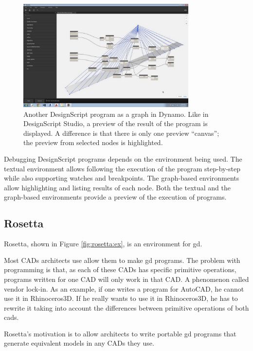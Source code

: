 \begin{figure}
	\centering
	\includegraphics[width=0.8\textwidth]{images/ds_dynamo}
	\caption[Another DesignScript program as a graph in Dynamo. Like in DesignScript Studio, a preview of the result of the program is displayed.]{Another DesignScript program as a graph in Dynamo. Like in DesignScript Studio, a preview of the result of the program is displayed. A difference is that there is only one preview ``canvas''; the preview from selected nodes is highlighted.}
	\label{fig:ds:dynamo}
\end{figure}

Debugging DesignScript programs depends on the environment being used.
The textual environment allows following the execution of the program step-by-step while also supporting watches and breakpoints.
The graph-based environments allow highlighting and listing results of each node.
Both the textual and the graph-based environments provide a preview of the execution of programs.


\subsection{Rosetta}
\label{section:rosetta:related}
Rosetta\cite{de2012modern,lopes2011portable}, shown in Figure \ref{fig:rosetta:ex}, is an environment for \gls{gd}.

Most CADs architects use allow them to make \gls{gd} programs.
The problem with programming is that, as each of these CADs has specific primitive operations, programs written for one CAD will only work in that CAD.
A phenomenon called vendor lock-in.
As an example, if one writes a program for AutoCAD, he cannot use it in Rhinoceros3D.
If he really wants to use it in Rhinoceros3D, he has to rewrite it taking into account the differences between primitive operations of both \glspl{cad}.

Rosetta's motivation is to allow architects to write portable \gls{gd} programs that generate equivalent models in any CADs they use.

